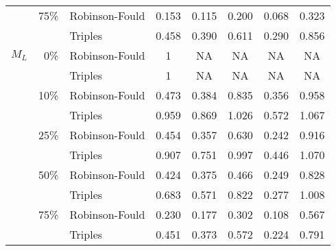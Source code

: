 \begin{tabular}{rrlccccc}
              & 75\%         & Robinson-Fould & 0.153 & 0.115  & 0.200 & 0.068  & 0.323 \\
              &              & Triples        & 0.458 & 0.390  & 0.611 & 0.290  & 0.856 \\   
    $M_L$     & 0\%          & Robinson-Fould & 1 & NA  & NA & NA  & NA \\
              &              & Triples        & 1 & NA  & NA & NA  & NA \\
              & 10\%         & Robinson-Fould & 0.473 & 0.384  & 0.835 & 0.356  & 0.958 \\
              &              & Triples        & 0.959 & 0.869  & 1.026 & 0.572  & 1.067 \\
              & 25\%         & Robinson-Fould & 0.454 & 0.357  & 0.630 & 0.242  & 0.916 \\
              &              & Triples        & 0.907 & 0.751  & 0.997 & 0.446  & 1.070 \\
              & 50\%         & Robinson-Fould & 0.424 & 0.375  & 0.466 & 0.249  & 0.828 \\
              &              & Triples        & 0.683 & 0.571  & 0.822 & 0.277  & 1.008 \\
              & 75\%         & Robinson-Fould & 0.230 & 0.177  & 0.302 & 0.108  & 0.567 \\
              &              & Triples        & 0.451 & 0.373  & 0.572 & 0.224  & 0.791 \\
    \hline
\end{tabular}